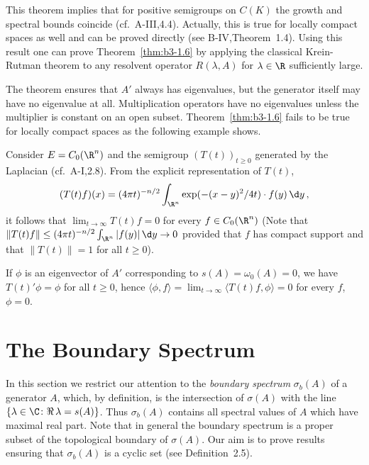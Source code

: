 This theorem implies that for positive semigroups on $C(K)$ the growth and spectral bounds coincide (cf.\ A-III,4.4).
Actually, this is true for locally compact spaces as well and can be proved directly (see B-IV,Theorem~1.4).
Using this result one can prove Theorem~\ref{thm:b3-1.6} by applying the classical Krein-Rutman theorem to any resolvent operator $R(\lambda,A)$ for $\lambda \in \R$ sufficiently large.

The theorem ensures that $A'$ always has eigenvalues, but the generator itself may have no eigenvalue at all.
Multiplication operators have no eigenvalues unless the multiplier is constant on an open subset.
Theorem~\ref{thm:b3-1.6} fails to be true for locally compact spaces as the following example shows.
\begin{example}\label{ex:b3-1.7}
	Consider $E = C_{0}(\R^{n})$ and the semigroup $(T(t))_{t \geq 0}$ generated by the Laplacian (cf.\ A-I,2.8).
From the explicit representation of $T(t)$,
	\begin{equation}\label{eq:b3-1.17}
		(T(t)f)(x) = (4\pi t)^{-n/2}\int_{\R^{n}} \exp(-(x-y)^{2}/4t)\cdot f(y) \, \d y\,,
	\end{equation}
	it follows that $\lim_{t \to \infty}T(t)f = 0$ for every $f \in C_{0}(\R^{n})$ (Note that $\|T(t)f\| \leq (4\pi t)^{-n/2}\int_{\R^{n}} |f(y)|\,\d y \to 0$ provided that $f$ has compact support and that $\|T(t)\| = 1$ for all $t \geq 0$).
	
	If $\phi$ is an eigenvector of $A'$ corresponding to $s(A) = \omega_{0}(A) = 0$, we have $T(t)'\phi = \phi$ for all $t \geq 0$, hence $\langle \phi,f \rangle = \lim_{t \to \infty}\langle T(t)f,\phi \rangle = 0$ for every $f$, \ie $\phi = 0$.
\end{example}
%
%		
\section{The Boundary Spectrum}\label{sec:b3-2}
In this section we restrict our attention to the \emph{boundary spectrum} $\sigma_{b}(A)$ of a generator $A$, which, by definition, is the intersection of $\sigma(A)$ with the line $\{\lambda \in \C \colon \Re\,\lambda  = s(A)\}$.
Thus $\sigma_{b}(A)$ contains all spectral values of $A$ which have maximal real part.
Note that in general the boundary spectrum is a proper subset of the topological boundary of $\sigma(A)$.
Our aim is to prove results ensuring that $\sigma_{b}(A)$ is a cyclic set (see Definition~2.5).

